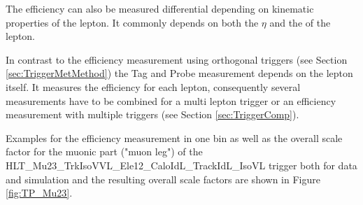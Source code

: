 The efficiency can also be measured differential depending on kinematic properties of the lepton. It commonly depends on both the $\eta$ and the \pt of the lepton. 

In contrast to the efficiency measurement using orthogonal triggers (see Section \ref{sec:TriggerMetMethod}) the Tag and Probe measurement depends on the lepton itself. It measures the efficiency for each lepton, consequently several measurements have to be combined for a multi lepton trigger or an efficiency measurement with multiple triggers (see Section \ref{sec:TriggerComp}). 

Examples for the efficiency measurement in one bin as well as the overall scale factor for the muonic part ("muon leg") of the\\ HLT\_Mu23\_TrkIsoVVL\_Ele12\_CaloIdL\_TrackIdL\_IsoVL trigger both for data and simulation and the resulting overall scale factors are shown in Figure \ref{fig:TP_Mu23}.

